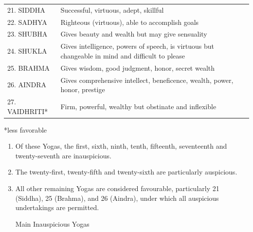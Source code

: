 \begin{enumerate}
\begin{center}
\begin{tabular}{ l l l}
21. SIDDHA	&Successful, virtuous, adept, skillful                               \\
22. SADHYA	&Righteous (virtuous), able to accomplish goals                               \\
23. SHUBHA	&Gives beauty and wealth but may give sensuality                               \\
24. SHUKLA	&Gives intelligence, powers of speech, is virtuous but changeable in mind and difficult to please                               \\
25. BRAHMA	&Gives wisdom, good judgment, honor, secret wealth                               \\
26. AINDRA	&Gives comprehensive intellect, beneficence, wealth, power, honor, prestige                               \\
27. VAIDHRITI*	&Firm, powerful, wealthy but obstinate and inflexible                               \\
\end{tabular}
\end{center}
 

*less favorable

 

\begin{enumerate} 
\item[] Of these Yogas, the first, sixth, ninth, tenth, fifteenth, seventeenth and twenty-seventh are inauspicious.
\item[] The twenty-first, twenty-fifth and twenty-sixth are particularly auspicious.
\item[] All other remaining Yogas are considered favourable, particularly 21 (Siddha), 25 (Brahma), and 26 (Aindra), under which all auspicious undertakings are permitted.
 

Main  Inauspicious  Yogas


\end{enumerate}
\end{enumerate}
